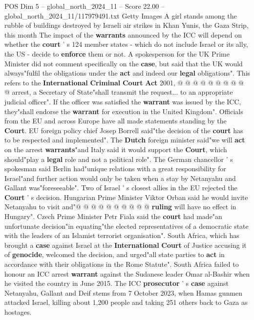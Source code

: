 \begin{textsample}{POS Dim 5 – global\_north\_2024\_11 – Score 22.00 – global\_north\_2024\_11/117979491.txt}
Getty Images A girl stands among the rubble of buildings destroyed by Israeli air strikes in Khan Yunis, the Gaza Strip, this month The impact of the \textbf{warrants} announced by the ICC will depend on whether the \textbf{court} ' s 124 member states - which do not include Israel or its ally, the US - decide to \textbf{enforce} them or not.
A spokesperson for the UK Prime Minister did not comment specifically on the \textbf{case}, but said that the UK would always"fulfil the obligations under the \textbf{act} and indeed our \textbf{legal} obligations".
This refers to the \textbf{International} \textbf{Criminal} \textbf{Court} \textbf{Act} 2001, @ @ @ @ @ @ @ @ @ @ arrest, a Secretary of State"shall transmit the request... to an appropriate judicial officer".
If the officer was satisfied the \textbf{warrant} was issued by the ICC, they"shall endorse the \textbf{warrant} for execution in the United Kingdom".
Officials from the EU and across Europe have all made statements standing by the \textbf{Court}.
EU foreign policy chief Josep Borrell said"the decision of the \textbf{court} has to be respected and implemented".
The \textbf{Dutch} foreign minister said"we will \textbf{act} on the arrest \textbf{warrants}"and Italy said it would support the \textbf{Court}, which should"play a \textbf{legal} role and not a political role".
The German chancellor ' s spokesman said Berlin had"unique relations with a great responsibility for Israel"and further action would only be taken when a stay by Netanyahu and Gallant was"foreseeable".
Two of Israel ' s closest allies in the EU rejected the \textbf{Court} ' s decision.
Hungarian Prime Minister Viktor Orban said he would invite Netanyahu to visit and"@ @ @ @ @ @ @ @ @ @ \textbf{ruling} will have no effect in Hungary".
Czech Prime Minister Petr Fiala said the \textbf{court} had made"an unfortunate decision"in equating"the elected representatives of a democratic state with the leaders of an Islamist terrorist organisation".
South Africa, which has brought a \textbf{case} against Israel at the \textbf{International} \textbf{Court} of Justice accusing it of \textbf{genocide}, welcomed the decision, and urged"all state parties to \textbf{act} in accordance with their obligations in the Rome Statute".
South Africa failed to honour an ICC arrest \textbf{warrant} against the Sudanese leader Omar al-Bashir when he visited the country in June 2015.
The ICC \textbf{prosecutor} ' s \textbf{case} against Netanyahu, Gallant and Deif stems from 7 October 2023, when Hamas gunmen attacked Israel, killing about 1,200 people and taking 251 others back to Gaza as hostages.

\end{textsample}
